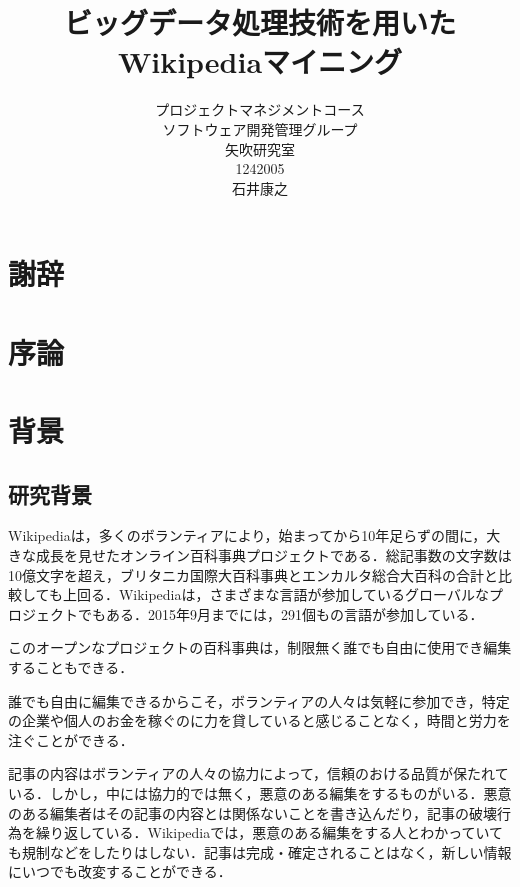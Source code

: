 

\usepackage{here}

\title{ビッグデータ処理技術を用いたWikipediaマイニング}
\author{プロジェクトマネジメントコース\\
ソフトウェア開発管理グループ\\
矢吹研究室\\
1242005\\
石井康之}
\date{}

\maketitle

\chapter*{謝辞}

\tableofcontents%

\chapter{序論}

\chapter{背景}

\section{研究背景}
Wikipediaは，多くのボランティアにより，始まってから10年足らずの間に，大きな成長を見せたオンライン百科事典プロジェクトである．総記事数の文字数は10億文字を超え，ブリタニカ国際大百科事典とエンカルタ総合大百科の合計と比較しても上回る．Wikipediaは，さまざまな言語が参加しているグローバルなプロジェクトでもある．2015年9月までには，291個もの言語が参加している．

このオープンなプロジェクトの百科事典は，制限無く誰でも自由に使用でき編集することもできる．

誰でも自由に編集できるからこそ，ボランティアの人々は気軽に参加でき，特定の企業や個人のお金を稼ぐのに力を貸していると感じることなく，時間と労力を注ぐことができる．

記事の内容はボランティアの人々の協力によって，信頼のおける品質が保たれている．しかし，中には協力的では無く，悪意のある編集をするものがいる．悪意のある編集者はその記事の内容とは関係ないことを書き込んだり，記事の破壊行為を繰り返している．Wikipediaでは，悪意のある編集をする人とわかっていても規制などをしたりはしない．記事は完成・確定されることはなく，新しい情報にいつでも改変することができる．

